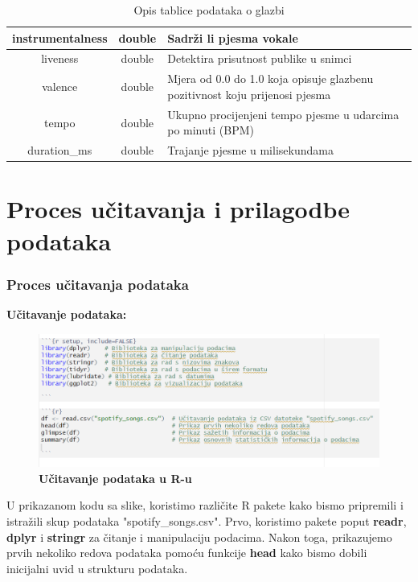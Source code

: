 \begin{table}[h]
\begin{tabular}{|c|c|p{8cm}|}
	instrumentalness & double & Sadrži li pjesma vokale \\ \hline
	liveness & double & Detektira prisutnost publike u snimci \\ \hline
	valence & double & Mjera od 0.0 do 1.0 koja opisuje glazbenu pozitivnost koju prijenosi pjesma \\ \hline
	tempo & double & Ukupno procijenjeni tempo pjesme u udarcima po minuti (BPM) \\ \hline
	duration\_ms & double & Trajanje pjesme u milisekundama \\ \hline
	\end{tabular}
	\caption{Opis tablice podataka o glazbi}
	\label{tab:glazba}
	\end{table}

\clearpage
\section{Proces učitavanja i prilagodbe podataka}

	\subsubsection{Proces učitavanja podataka}
	
		\textbf{Učitavanje podataka:}
		\begin{figure}[H]
			\centering
			\includegraphics[scale=0.9]{slike/ucitavanje.png}
			\caption{\textbf{Učitavanje podataka u R-u}}
		\end{figure}
		
		U prikazanom kodu sa slike, koristimo različite R pakete kako bismo pripremili i istražili skup podataka "spotify\_songs.csv". Prvo, koristimo pakete poput \textbf{readr}, \textbf{dplyr} i \textbf{stringr} za čitanje i manipulaciju podacima. Nakon toga, prikazujemo prvih nekoliko redova podataka pomoću funkcije \textbf{head} kako bismo dobili inicijalni uvid u strukturu podataka.
		
